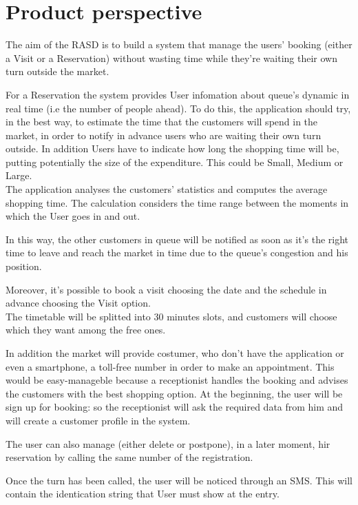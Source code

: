 \section{Product perspective}

The aim of the RASD is to build a system that manage the users’ booking (either a Visit or a Reservation) without wasting time while they're waiting their own turn outside the market. 
\par
For a Reservation the system provides User infomation about queue's dynamic in real time (i.e the number of people ahead). 
To do this, the application should try, in the best way, to estimate the time that the customers will spend in the market, in order to notify in advance users who are waiting their own turn outside. 
In addition Users have to indicate how long the shopping time will be, putting potentially the size of the expenditure. This could be Small, Medium or Large.
\\
The application analyses the customers’ statistics and computes the average shopping time.
The calculation considers the time range between the moments in which the User goes in and out.  
\par
In this way, the other customers in queue will be notified as soon as it's the right time to leave and reach the market in time due to the queue's congestion and his position.  

\par
Moreover, it's possible to book a visit choosing the date and the schedule in advance choosing the Visit option. 
\\
The timetable will be splitted into 30 minutes slots, and customers will choose which they want among the free ones. \par

In addition the market will provide costumer, who don't have the application or even a smartphone, a toll-free number in order to make an appointment.
This would be easy-manageble because a receptionist handles the booking and advises the customers with the best shopping option. %
At the beginning, the user will be sign up for booking: so the receptionist will ask the required data from him and will create a customer profile in the system.

The user can also manage (either delete or postpone), in a later moment, hir reservation by calling the same number of the registration.


Once the turn has been called, the user will be noticed through an SMS.
This will contain the identication string that User must show at the entry.

